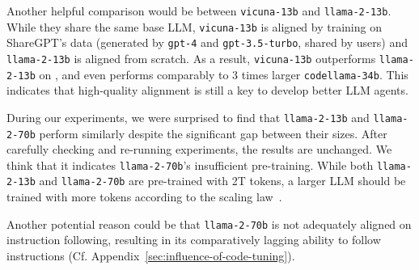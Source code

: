 Another helpful comparison would be between \texttt{vicuna-13b} and \texttt{llama-2-13b}.
While they share the same base LLM, \texttt{vicuna-13b} is aligned by training on ShareGPT's data (generated by \texttt{gpt-4} and \texttt{gpt-3.5-turbo}, shared by users) and \texttt{llama-2-13b} is aligned from scratch.
As a result, \texttt{vicuna-13b} outperforms \texttt{llama-2-13b} on \model, and even performs comparably to 3 times larger \texttt{codellama-34b}.
This indicates that high-quality alignment is still a key to develop better LLM agents.

During our experiments, we were surprised to find that \texttt{llama-2-13b} and \texttt{llama-2-70b} perform similarly despite the significant gap between their sizes.
After carefully checking and re-running experiments, the results are unchanged.
We think that it indicates \texttt{llama-2-70b}'s insufficient pre-training.
While both \texttt{llama-2-13b} and \texttt{llama-2-70b} are pre-trained with 2T tokens, a larger LLM should be trained with more tokens according to the scaling law~\citep{hoffmann2022training}.

Another potential reason could be that \texttt{llama-2-70b} is not adequately aligned on instruction following, resulting in its comparatively lagging ability to follow instructions (Cf. Appendix~\ref{sec:influence-of-code-tuning}).
